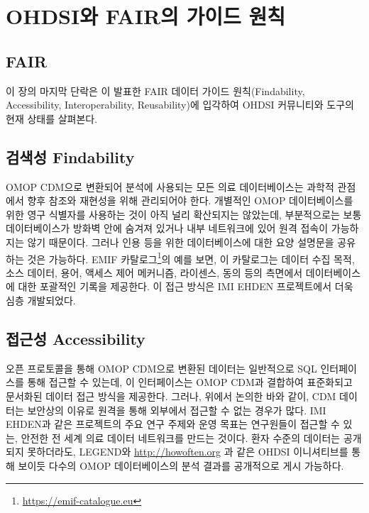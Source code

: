 \documentclass[10.5pt]{book}
\let\rmarkdownfootnote\footnote%
\def\footnote{\protect\rmarkdownfootnote}
\theoremstyle{definition}
\theoremstyle{definition}
\theoremstyle{definition}
\theoremstyle{remark}
\begin{document}
\section{OHDSI와 FAIR의 가이드 원칙}\label{ohdsi-fair--}


\subsection{FAIR}\label{fair}

이 장의 마지막 단락은 \citet{wilkinson2016} 이 발표한 FAIR 데이터 가이드
원칙(Findability, Accessibility, Interoperability, Reusability)에
입각하여 OHDSI 커뮤니티와 도구의 현재 상태를 살펴본다.

\subsection{검색성 Findability}\label{-findability}

OMOP CDM으로 변환되어 분석에 사용되는 모든 의료 데이터베이스는 과학적
관점에서 향후 참조와 재현성을 위해 관리되어야 한다. 개별적인 OMOP
데이터베이스를 위한 영구 식별자를 사용하는 것이 아직 널리 확산되지는
않았는데, 부분적으로는 보통 데이터베이스가 방화벽 안에 숨겨져 있거나
내부 네트워크에 있어 원격 접속이 가능하지는 않기 때문이다. 그러나 인용
등을 위한 데이터베이스에 대한 요양 설명문을 공유하는 것은 가능하다. EMIF
카탈로그\footnote{\url{https://emif-catalogue.eu}}의 예를 보면, 이
카탈로그는 데이터 수집 목적, 소스 데이터, 용어, 액세스 제어 메커니즘,
라이센스, 동의 등의 측면에서 데이터베이스에 대한 포괄적인 기록을
제공한다. \citep{Oliveira2019} 이 접근 방식은 IMI EHDEN 프로젝트에서
더욱 심층 개발되었다.

\subsection{접근성 Accessibility}\label{-accessibility}

오픈 프로토콜을 통해 OMOP CDM으로 변환된 데이터는 일반적으로 SQL
인터페이스를 통해 접근할 수 있는데, 이 인터페이스는 OMOP CDM과 결합하여
표준화되고 문서화된 데이터 접근 방식을 제공한다. 그러나, 위에서 논의한
바와 같이, CDM 데이터는 보안상의 이유로 원격을 통해 외부에서 접근할 수
없는 경우가 많다. IMI EHDEN과 같은 프로젝트의 주요 연구 주제와 운영
목표는 연구원들이 접근할 수 있는, 안전한 전 세계 의료 데이터 네트워크를
만드는 것이다. 환자 수준의 데이터는 공개되지 못하더라도, LEGEND와
\url{http://howoften.org} 과 같은 OHDSI 이니셔티브를 통해 보이듯 다수의
OMOP 데이터베이스의 분석 결과를 공개적으로 게시 가능하다.
\end{document}

